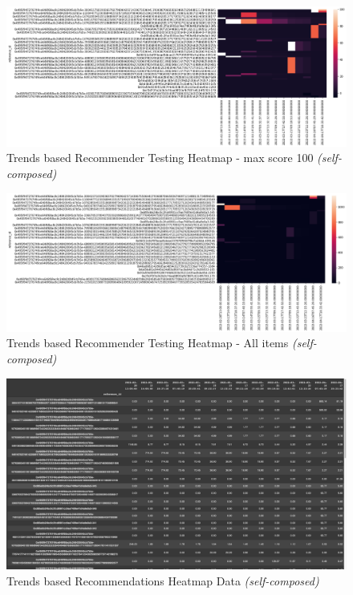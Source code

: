 \begin{figure}[h!]
\centering
\includegraphics[width=\textwidth]{images/Testing/trends/trends-heatmap-100.png}
\caption{Trends based Recommender Testing Heatmap - max score 100 \textit{(self-composed)}}
\label{fig:trends-recsys-heatmap-100}
\end{figure}

\begin{figure}[h!]
\centering
\includegraphics[width=\textwidth]{images/Testing/trends/trends-heatmap-all.png}
\caption{Trends based Recommender Testing Heatmap - All items \textit{(self-composed)}}
\label{fig:trends-recsys-heatmap-all}
\end{figure}

\begin{figure}[h!]
\centering
\includegraphics[width=\textwidth]{images/Testing/trends/heatmap-data.png}
\caption{Trends based Recommendations Heatmap Data \textit{(self-composed)}}
\label{fig:trends-recsys-heatmap-data-matrix}
\end{figure}


